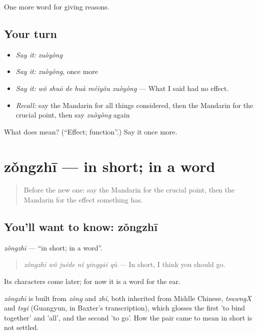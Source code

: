 \begin{grammarlens}[title={What you've built}]
One more word for giving reasons.
\end{grammarlens}

\subsection*{Your turn}
\begin{itemize}
\raggedright
  \item \emph{Say it:} \emph{zuòyòng}
  \item \emph{Say it:} \emph{zuòyòng}, once more
  \item \emph{Say it:} \emph{wǒ shuō de huà méiyǒu zuòyòng} — What I said had no effect.
  \item \emph{Recall:} say the Mandarin for all things considered, then the Mandarin for the crucial point, then say \emph{zuòyòng} again
\end{itemize}

\begin{tcolorbox}[breakable,colback=teal!4,colframe=teal!35!black,title={Before you move on}]
What does  mean? (\textquotedblleft{}Effect; function\textquotedblright{}.) Say it once more.
\end{tcolorbox}
\section[zǒngzhī]{zǒngzhī — in short; in a word}

\label{lesson:ZH-C370-zongzhi}



\begin{quote}
Before the new one: say the Mandarin for the crucial point, then the Mandarin for the effect something has.
\end{quote}

\subsection*{You'll want to know: zǒngzhī}
\emph{zǒngzhī} — \textquotedblleft{}in short; in a word\textquotedblright{}.

\begin{quote}
\emph{zǒngzhī wǒ juéde nǐ yīnggāi qù} — In short, I think you should go.
\end{quote}

Its characters come later; for now it is a word for the ear.

\begin{cousinweb}
\emph{zǒngzhī} is built from \emph{zǒng} and \emph{zhī}, both inherited from Middle Chinese, \emph{tsuwngX} and \emph{tsyi} (Guangyun, in Baxter's transcription), which glosses the first 'to bind together' and 'all', and the second 'to go'. How the pair came to mean in short is not settled.
\end{cousinweb}

